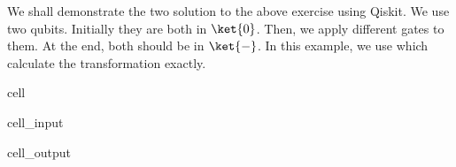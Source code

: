 \documentclass[letterpaper,10pt,english]{jupyterBook}
\begin{document}
\sphinxAtStartPar
{}

\sphinxAtStartPar
We shall demonstrate the two solution to the above exercise using Qiskit.  We use two qubits.  Initially they are both in \(\ket{0}\).  Then, we apply different gates to them. At the end, both should be in \(\ket{-}\).  In this example, we use  which calculate the transformation exactly.

\begin{sphinxuseclass}{cell}\begin{sphinxVerbatimInput}

\begin{sphinxuseclass}{cell_input}
\begin{sphinxVerbatim}[commandchars=\\\{\}]
   
   
  

  



\end{sphinxVerbatim}

\end{sphinxuseclass}\end{sphinxVerbatimInput}
\begin{sphinxVerbatimOutput}

\begin{sphinxuseclass}{cell_output}
\noindent{}

\end{sphinxuseclass}\end{sphinxVerbatimOutput}

\end{sphinxuseclass}
\end{document}
